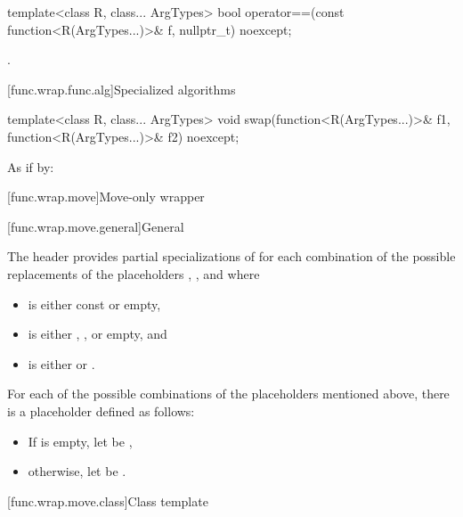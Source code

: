%
\begin{itemdecl}
template<class R, class... ArgTypes>
  bool operator==(const function<R(ArgTypes...)>& f, nullptr_t) noexcept;
\end{itemdecl}

\begin{itemdescr}
\pnum
\returns
{}.
\end{itemdescr}

[func.wrap.func.alg]{Specialized algorithms}

%
\begin{itemdecl}
template<class R, class... ArgTypes>
  void swap(function<R(ArgTypes...)>& f1, function<R(ArgTypes...)>& f2) noexcept;
\end{itemdecl}

\begin{itemdescr}
\pnum
\effects
As if by: 
\end{itemdescr}%

[func.wrap.move]{Move-only wrapper}

[func.wrap.move.general]{General}

\pnum
The header provides partial specializations of 
for each combination of the possible replacements
of the placeholders \cv{}, , and  where
\begin{itemize}
\item
\cv{} is either const or empty,
\item
{} is either \tcode{\&}, \tcode{\&\&}, or empty, and
\item
{} is either  or .
\end{itemize}

\pnum
For each of the possible combinations of the placeholders mentioned above,
there is a placeholder  defined as follows:
\begin{itemize}
\item
If  is empty, let  be \cv{}\tcode{\&},
\item
otherwise, let  be \cv{} .
\end{itemize}

[func.wrap.move.class]{Class template }

